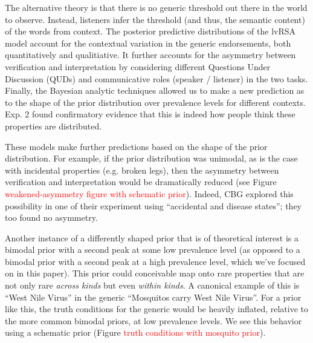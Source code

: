 \documentclass[10pt,letterpaper]{article}
\newcommand{\red}[1]{\textcolor{Red}{#1}}
\begin{document}
The alternative theory is that there is no generic threshold out there in the world to observe. Instead, listeners infer the threshold (and thus, the semantic content) of the words from context. The posterior predictive distributions of the lvRSA model account for the contextual variation in the generic endorsements, both quantitatively and qualitiative. It further accounts for the asymmetry between verification and interpretation by considering different Questions Under Discussion (QUDs) and communicative roles (speaker / listener) in the two tasks. Finally, the Bayesian analytic techniques allowed us to make a new prediction as to the shape of the prior distribution over prevalence levels for different contexts. Exp. 2 found confirmatory evidence that this is indeed how people think these properties are distributed.

%
 

These models make further predictions based on the shape of the prior distribution. For example, if the prior distribution was unimodal, as is the case with incidental properties (e.g. broken legs), then the asymmetry between verification and interpretation would be dramatically reduced (see Figure \red{weakened-asymmetry figure with schematic prior}). Indeed, CBG explored this possibility in one of their experiment using ``accidental and disease states''; they too found no asymmetry. 

Another instance of a differently shaped prior that is of theoretical interest is a bimodal prior with a second peak at some low prevalence level (as opposed to a bimodal prior with a second peak at a high prevalence level, which we've focused on in this paper). This prior could conceivable map onto rare properties that are not only rare \emph{across kinds} but even \emph{within kinds}. A canonical example of this is ``West Nile Virus'' in the generic ``Mosquitos carry West Nile Virus''. For a prior like this, the truth conditions for the generic would be heavily inflated, relative to the more common bimodal priors, at low prevalence levels. We see this behavior using a schematic prior (Figure \red{truth conditions with mosquito prior}). 
\end{document}
